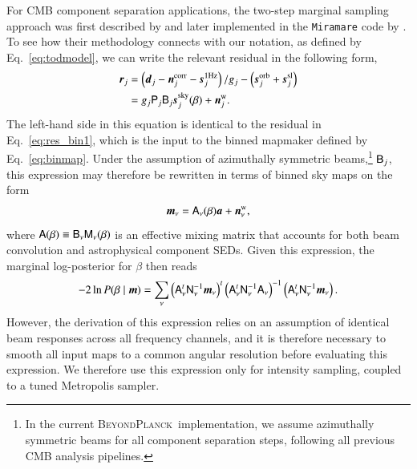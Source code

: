 \documentclass[twocolumn]{aa}
\renewcommand{\d}[0]{\vec{d}}
\newcommand{\A}[0]{\tens{A}}
\newcommand{\n}[0]{\vec{n}}
\newcommand{\s}[0]{\vec{s}}
\renewcommand{\a}[0]{\vec{a}}
\newcommand{\m}[0]{\vec{m}}
\newcommand{\B}[0]{\tens{B}}
\newcommand{\N}[0]{\tens{N}}
\newcommand{\M}[0]{\tens{M}}
\renewcommand{\r}[0]{\vec{r}}
\renewcommand{\P}[0]{\tens{P}}
\newcommand{\BP}{\textsc{BeyondPlanck}}
\begin{document}
For CMB component separation applications, the two-step marginal
sampling approach was first described by \citet{stompor:2008} and
later implemented in the \texttt{Miramare} code by \citet{stivoli:2010}. To see
how their methodology connects with our notation, as defined by
Eq.~\eqref{eq:todmodel}, we can write the relevant residual in the
following form,
\begin{align}
    \nonumber
    \r_j &= \left(\d_j - \n_j^{\mathrm{corr}} - \s_j^{\mathrm{1Hz}}\right)/g_j -
\left(\s_j^{\mathrm{orb}} + \s_j^{\mathrm{sl}}\right)
    \\
    &= g_j\P_j\B_j\s_j^{\mathrm{sky}}(\beta) +
\n_j^{\mathrm{w}}.
\label{eq:beta_res}
\end{align}
The left-hand side in this equation is identical to the residual in
Eq.~\eqref{eq:res_bin1}, which is the input to the binned mapmaker
defined by Eq.~\eqref{eq:binmap}. Under the assumption of azimuthally
symmetric beams,\footnote{In the current \BP\ implementation, we assume
  azimuthally symmetric beams for all component separation steps,
  following all previous CMB analysis pipelines.} $\B_j$, this
expression may therefore be rewritten in terms of binned sky maps on
the form
\begin{equation}
  \m_{\nu} = \A_{\nu}(\beta)\a +\n^{\mathrm{w}}_{\nu},
  \label{eq:beta_data}
\end{equation}
where $\A(\beta) \equiv \B_{\nu}\M_{\nu}(\beta)$ is an effective
mixing matrix that accounts for both beam convolution and
astrophysical component SEDs. Given this expression, the marginal
log-posterior for $\beta$ then reads \citep{stompor:2008}
\begin{equation}
-2\ln P(\beta\mid \m) = \sum_{\nu}\left(\A_{\nu}^t\N_{\nu}^{-1}\m_{\nu}\right)^t
\left(\A_{\nu}^t\N_{\nu}^{-1}\A_{\nu}\right)^{-1}\left(\A_{\nu}^t\N_{\nu}^{-1}\m_{\nu}\right).
\label{eq:beta_marg}
\end{equation}
However, the derivation of this expression relies on an assumption of
identical beam responses across all frequency channels, and it is
therefore necessary to smooth all input maps to a common angular
resolution before evaluating this expression. We therefore use
this expression only for intensity sampling, coupled to a tuned Metropolis
sampler.
\end{document}
